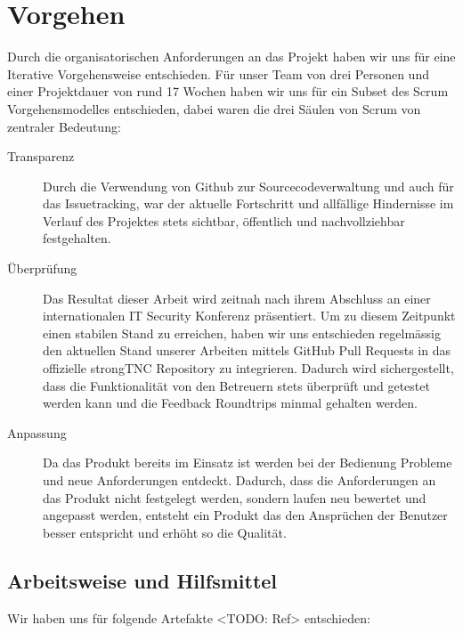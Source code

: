 \chapter{Vorgehen}

Durch die organisatorischen Anforderungen an das Projekt haben wir uns für eine
Iterative Vorgehensweise entschieden. Für unser Team von drei Personen und einer
Projektdauer von rund 17 Wochen haben wir uns für ein Subset des Scrum Vorgehensmodelles
entschieden, dabei waren die drei Säulen von Scrum von zentraler Bedeutung:

\begin{description}
	\item[Transparenz] Durch die Verwendung von Github zur Sourcecodeverwaltung und
	auch für das Issuetracking, war der aktuelle Fortschritt und allfällige
	Hindernisse im Verlauf des Projektes stets sichtbar, öffentlich und
	nachvollziehbar festgehalten.

	\item[Überprüfung] Das Resultat dieser Arbeit wird zeitnah nach ihrem Abschluss
	an einer internationalen IT Security Konferenz präsentiert. Um zu diesem
	Zeitpunkt einen stabilen Stand zu erreichen, haben wir uns entschieden
	regelmässig den aktuellen Stand unserer Arbeiten mittels GitHub Pull Requests
	in das offizielle strongTNC Repository zu integrieren. Dadurch wird
	sichergestellt, dass die Funktionalität von den Betreuern stets überprüft und
	getestet werden kann und die Feedback Roundtrips minmal gehalten werden.

	\item[Anpassung] Da das Produkt bereits im Einsatz ist werden bei der Bedienung
	Probleme und neue Anforderungen entdeckt. Dadurch, dass die Anforderungen an das
	Produkt nicht festgelegt werden, sondern laufen neu bewertet und angepasst
	werden, entsteht ein Produkt das den Ansprüchen der Benutzer besser entspricht
	und erhöht so die Qualität.

\end{description}

\section{Arbeitsweise und Hilfsmittel}
Wir haben uns für folgende Artefakte <TODO: Ref> entschieden:

